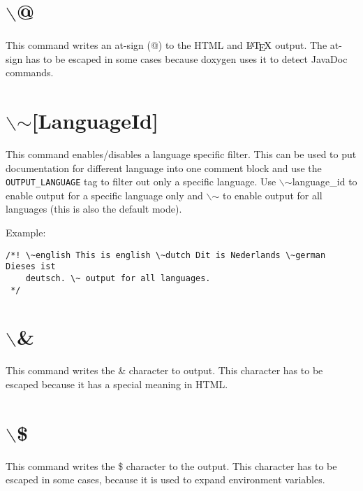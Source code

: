 \hypertarget{commands_cmdat}{}\section{$\backslash$@}\label{commands_cmdat}
 This command writes an at-sign (@) to the HTML and $\mbox{\LaTeX}$ output. The at-sign has to be escaped in some cases because doxygen uses it to detect JavaDoc commands.



 \hypertarget{commands_cmdtilde}{}\section{$\backslash$$\sim$\mbox{[}LanguageId\mbox{]}}\label{commands_cmdtilde}
 This command enables/disables a language specific filter. This can be used to put documentation for different language into one comment block and use the {\tt OUTPUT\_\-LANGUAGE} tag to filter out only a specific language. Use $\backslash$$\sim$language\_\-id to enable output for a specific language only and $\backslash$$\sim$ to enable output for all languages (this is also the default mode).

Example: 

\footnotesize\begin{verbatim}
/*! \~english This is english \~dutch Dit is Nederlands \~german Dieses ist
    deutsch. \~ output for all languages.
 */
\end{verbatim}
\normalsize




 \hypertarget{commands_cmdamp}{}\section{$\backslash$\&}\label{commands_cmdamp}
 This command writes the \& character to output. This character has to be escaped because it has a special meaning in HTML.



 \hypertarget{commands_cmddollar}{}\section{$\backslash$\$}\label{commands_cmddollar}
 This command writes the \$ character to the output. This character has to be escaped in some cases, because it is used to expand environment variables.



